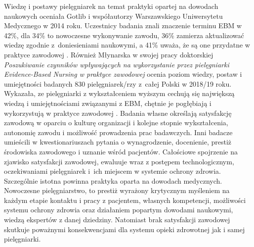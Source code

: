 \documentclass[a4paper,12pt,twoside,openright]{mwrep}
\begin{document}
Wiedzę i postawy pielęgniarek na temat praktyki opartej na dowodach naukowych oceniała Gotlib i współautorzy Warszawskiego Uniwersytetu Medycznego w 2014 roku. Uczestnicy badania znali znaczenie terminu EBM w 42\%, dla 34\% to nowoczesne wykonywanie zawodu, 36\% zamierza aktualizować wiedzę zgodnie z~doniesieniami naukowymi, a 41\% uważa, że są one przydatne w praktyce zawodowej \cite{gotlib}.  Również Młynarska w swojej pracy doktorskiej \textit{ Poszukiwanie czynników wpływających na wykorzystanie przez pielęgniarki Evidence-Based Nursing w praktyce zawodowej} ocenia poziom wiedzy, postaw i umiejętności badanych 830 pielęgniarek/rzy z~całej Polski  w 2018/19 roku. Wykazała, ze pielęgniarki z wykształceniem wyższym cechują się największą wiedzą i umiejętnościami związanymi z EBM, chętnie je  pogłębiają i wykorzystują w praktyce zawodowej \cite{EBM}. Badania własne określają satysfakcję zawodową w oparciu o kulturę organizacji i kolejne stopnie wykształcenia, autonomię zawodu i możliwość prowadzenia prac badawczych. Inni badacze umieścili w kwestionariuszach pytania o wynagrodzenie, docenienie, prestiż środowiska zawodowego i uznanie wśród pacjentów. Całościowe spojrzenie na zjawisko satysfakcji zawodowej, ewaluuje wraz z postępem technologicznym, oczekiwaniami pielęgniarek i~ich miejscem w systemie ochrony zdrowia. Szczególnie istotna powinna praktyka oparta na dowodach medycznych. Nowoczesne pielęgniarstwo, to prestiż wyrażony krytycznym myśleniem na każdym etapie kontaktu i pracy z pacjentem, własnych kompetencji, możliwości systemu ochrony zdrowia oraz działaniem popartym dowodami naukowymi, wiedzą ekspertów z danej dziedziny. Natomiast brak satysfakcji zawodowej skutkuje poważnymi konsekwencjami dla systemu opieki zdrowotnej jak i samej pielęgniarki.
\end{document}
